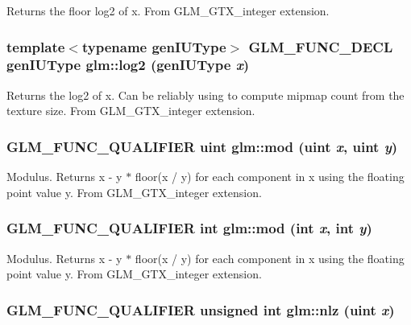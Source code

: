 Returns the floor log2 of x. From GLM\_\-GTX\_\-integer extension. \hypertarget{group__gtx__integer_g43dcff81ada0f7d4a29b25ca2a0cef2f}{
\subsubsection[log2]{\setlength{\rightskip}{0pt plus 5cm}template$<$typename genIUType$>$ GLM\_\-FUNC\_\-DECL genIUType glm::log2 (genIUType {\em x})}}
\label{group__gtx__integer_g43dcff81ada0f7d4a29b25ca2a0cef2f}


Returns the log2 of x. Can be reliably using to compute mipmap count from the texture size. From GLM\_\-GTX\_\-integer extension. \hypertarget{group__gtx__integer_gb8f9ec0ca93ca90669434224818f0750}{
\subsubsection[mod]{\setlength{\rightskip}{0pt plus 5cm}GLM\_\-FUNC\_\-QUALIFIER uint glm::mod (uint {\em x}, \/  uint {\em y})}}
\label{group__gtx__integer_gb8f9ec0ca93ca90669434224818f0750}


Modulus. Returns x - y $\ast$ floor(x / y) for each component in x using the floating point value y. From GLM\_\-GTX\_\-integer extension. \hypertarget{group__gtx__integer_gb9d22df91aac4d9eb925a4910f556f1b}{
\subsubsection[mod]{\setlength{\rightskip}{0pt plus 5cm}GLM\_\-FUNC\_\-QUALIFIER int glm::mod (int {\em x}, \/  int {\em y})}}
\label{group__gtx__integer_gb9d22df91aac4d9eb925a4910f556f1b}


Modulus. Returns x - y $\ast$ floor(x / y) for each component in x using the floating point value y. From GLM\_\-GTX\_\-integer extension. \hypertarget{group__gtx__integer_gcbe62fd2384464c16ea30ecc4defc11c}{
\subsubsection[nlz]{\setlength{\rightskip}{0pt plus 5cm}GLM\_\-FUNC\_\-QUALIFIER unsigned int glm::nlz (uint {\em x})}}
\label{group__gtx__integer_gcbe62fd2384464c16ea30ecc4defc11c}


